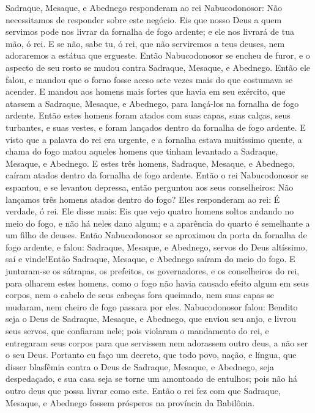 {Sadraque, Mesaque, e Abednego responderam ao rei Nabucodonosor: Não necessitamos de responder sobre este negócio.
Eis que nosso Deus a quem servimos pode nos livrar da fornalha de fogo ardente; e ele nos livrará de tua mão, ó rei.
E se não, sabe tu, ó rei, que não serviremos a teus deuses, nem adoraremos a estátua que ergueste.
Então Nabucodonosor se encheu de furor, e o aspecto de seu rosto se mudou contra Sadraque, Mesaque, e Abednego. Então ele falou, e mandou que o forno fosse aceso sete vezes mais do que costumava se acender.
E mandou aos homens mais fortes que havia em seu exército, que atassem a Sadraque, Mesaque, e Abednego, para lançá-los na fornalha de fogo ardente.
Então estes homens foram atados com suas capas, suas calças, seus turbantes, e suas vestes, e foram lançados dentro da fornalha de fogo ardente.
E visto que a palavra do rei era urgente, e a fornalha estava muitíssimo quente, a chama do fogo matou aqueles homens que tinham levantado a Sadraque, Mesaque, e Abednego.
E estes três homens, Sadraque, Mesaque, e Abednego, caíram atados dentro da fornalha de fogo ardente.
Então o rei Nabucodonosor se espantou, e se levantou depressa, então perguntou aos seus conselheiros: Não lançamos três homens atados dentro do fogo? Eles responderam ao rei: É verdade, ó rei.
Ele disse mais: Eis que vejo quatro homens soltos andando no meio do fogo, e não há neles dano algum; e a aparência do quarto é semelhante a um filho de deuses.
Então Nabucodonosor se aproximou da porta da fornalha de fogo ardente, e falou: Sadraque, Mesaque, e Abednego, servos do Deus altíssimo, saí e vinde!Então Sadraque, Mesaque, e Abednego saíram do meio do fogo.
E juntaram-se os sátrapas, os prefeitos, os governadores, e os conselheiros do rei, para olharem estes homens, como o fogo não havia causado efeito algum em seus corpos, nem o cabelo de seus cabeças fora queimado, nem suas capas se mudaram, nem cheiro de fogo passara por eles.
Nabucodonosor falou: Bendito seja o Deus de Sadraque, Mesaque, e Abednego, que enviou seu anjo, e livrou seus servos, que confiaram nele; pois violaram o mandamento do rei, e entregaram seus corpos para que servissem nem adorassem
{} outro deus, a não ser o seu Deus.
Portanto eu faço um decreto, que todo povo, nação, e língua, que disser blasfêmia contra o Deus de Sadraque, Mesaque, e Abednego, seja despedaçado, e sua casa seja se torne um amontoado de entulhos; pois não há outro deus que possa livrar como este.
Então o rei fez com que Sadraque, Mesaque, e Abednego fossem prósperos na província da Babilônia.

\par }

